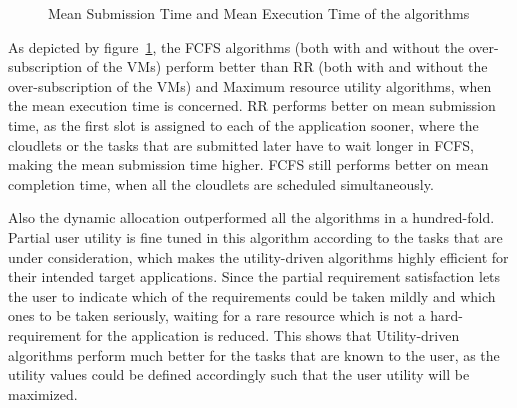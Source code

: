 \documentclass[times, 10pt,twocolumn]{article}
\begin{document}
\begin{figure}[ht]
 \caption{Mean Submission Time and Mean Execution Time of the algorithms}
 \label{fig:met}
\end{figure}

As depicted by figure~\ref{fig:met}, the FCFS algorithms (both with and without the over-subscription of the VMs) perform better than RR (both with and without the over-subscription of the VMs) and Maximum resource utility algorithms, when the mean execution time is concerned. RR performs better on mean submission time, as the first slot is assigned to each of the application sooner, where the cloudlets or the tasks that are submitted later have to wait longer in FCFS, making the mean submission time higher. FCFS still performs better on mean completion time, when all the cloudlets are scheduled simultaneously.

Also the dynamic allocation outperformed all the algorithms in a hundred-fold. Partial user utility is fine tuned in this algorithm according to the tasks that are under consideration, which makes the utility-driven algorithms highly efficient for their intended target applications. Since the partial requirement satisfaction lets the user to indicate which of the requirements could be taken mildly and which ones to be taken seriously, waiting for a rare resource which is not a hard-requirement for the application is reduced. This shows that Utility-driven algorithms perform much better for the tasks that are known to the user, as the utility values could be defined accordingly such that the user utility will be maximized. 
\end{document}
